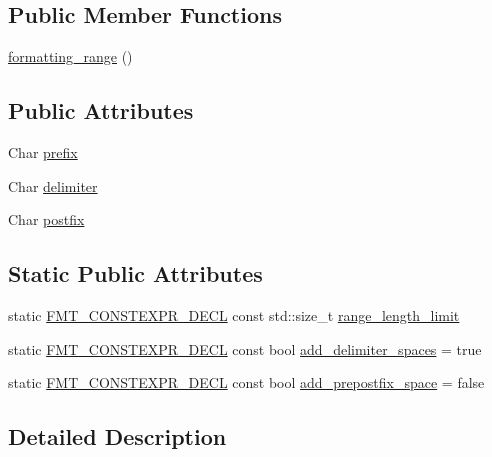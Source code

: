 \subsection*{Public Member Functions}
\begin{DoxyCompactItemize}
\item 
\hyperlink{structformatting__range_a9a2ebe150fd492aba1eddb30cea71be7}{formatting\+\_\+range} ()
\end{DoxyCompactItemize}
\subsection*{Public Attributes}
\begin{DoxyCompactItemize}
\item 
Char \hyperlink{structformatting__range_ada7fe968f694ec53469019303193c91c}{prefix}
\item 
Char \hyperlink{structformatting__range_ace2ff20a7fa6d9425f1e099f543f2290}{delimiter}
\item 
Char \hyperlink{structformatting__range_a91b4ee512cbb81d6020a33e2d8fec001}{postfix}
\end{DoxyCompactItemize}
\subsection*{Static Public Attributes}
\begin{DoxyCompactItemize}
\item 
static \hyperlink{core_8h_af4388801466a5994a363d6005616371a}{F\+M\+T\+\_\+\+C\+O\+N\+S\+T\+E\+X\+P\+R\+\_\+\+D\+E\+CL} const std\+::size\+\_\+t \hyperlink{structformatting__range_ab04cc7d9dcb2abd142011edd971129d1}{range\+\_\+length\+\_\+limit}
\item 
static \hyperlink{core_8h_af4388801466a5994a363d6005616371a}{F\+M\+T\+\_\+\+C\+O\+N\+S\+T\+E\+X\+P\+R\+\_\+\+D\+E\+CL} const bool \hyperlink{structformatting__range_ad007def7b6d911c6076864fc79f5fa54}{add\+\_\+delimiter\+\_\+spaces} = true
\item 
static \hyperlink{core_8h_af4388801466a5994a363d6005616371a}{F\+M\+T\+\_\+\+C\+O\+N\+S\+T\+E\+X\+P\+R\+\_\+\+D\+E\+CL} const bool \hyperlink{structformatting__range_afde3ac851d6b0a020fb03d477f3a77b5}{add\+\_\+prepostfix\+\_\+space} = false
\end{DoxyCompactItemize}


\subsection{Detailed Description}
